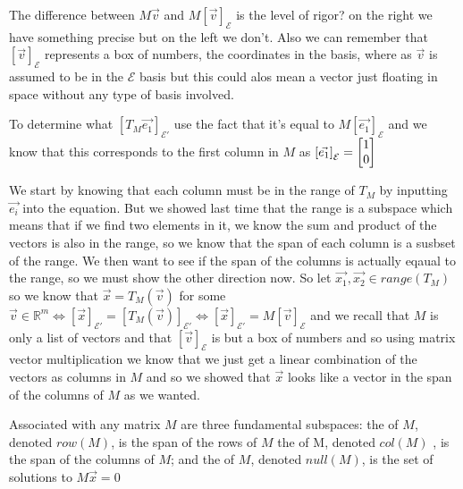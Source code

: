 \documentclass[11pt]{book}
\begin{document}
\begin{eg}
    The difference between $M\vec{v}$ and $M \left[ \vec{v} \right]_{\mathcal{E}}$ is the level of rigor? on the right we have something precise but on the left we don't. Also we can remember that $\left[ \vec{v} \right]_{\mathcal{E}}$ represents a box of numbers, the coordinates in the basis, where as $\vec{v}$ is assumed to be in the $\mathcal{E}$ basis but this could alos mean a vector just floating in space without any type of basis involved.
\end{eg}

\begin{eg}
    To determine what $\left[ T_{M}\vec{e_1} \right]_{\mathcal{E'}}$ use the fact that it's equal to $M\left[ \vec{e_1} \right]_{\mathcal{E}}$ and we know that this corresponds to the first column in $M$ as $\left[ \vec{e_1} \right]_{\mathcal{E}} = \begin{bmatrix} 1 \\ 0 \end{bmatrix}$ 
\end{eg}

\begin{eg}
    We start by knowing that each column must be in the range of $T_{M}$ by inputting $\vec{e_i}$ into the equation. But we showed last time that the range is a subspace which means that if we find two elements in it, we know the sum and product of the vectors is also in the range, so we know that the span of each column is a susbset of the range. %
    We then want to see if the span of the columns is actually eqaual to the range, so we must show the other direction now. So let $\vec{x_{1}}, \vec{x_2} \in \mathit{range} {\left( T_{M} \right)} $ so we know that $\vec{x} = T_{M}\left(\vec{v}\right)$ for some $\vec{v} \in \mathbb{R}^{m} \Leftrightarrow \left[ \vec{x} \right]_{\mathcal{E'}} = \left[ T_{M}\left(\vec{v}\right) \right]_{\mathcal{E'}} \Leftrightarrow \left[ \vec{x} \right]_{\mathcal{E'}} = M \left[ \vec{v} \right]_{\mathcal{E}}$ and we recall that $M$ is only a list of vectors and that $\left[ \vec{v} \right]_{\mathcal{E}}$ is but a box of numbers and so using matrix vector multiplication we know that we just get a linear combination of the vectors as columns in $M$ and so we showed that $\vec{x}$ looks like a vector in the span of the columns of $M$ as we wanted.
\end{eg}

\begin{defn}\label{defn:fundamental_subspaces}
    Associated with any matrix $M$ are three fundamental subspaces: the  of $M$,  denoted $row(M)$, is the span of the rows of $M$ the  of M, denoted $col(M)$ , is the span of the columns of $M$; and the  of $M$, denoted $\mathit{null} {\left( M \right)} $,  is the set of solutions to $M\vec{x} = 0$ 
\end{defn}
\end{document}
